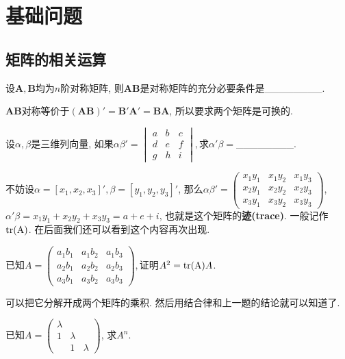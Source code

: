 \section{基础问题}

\subsection{矩阵的相关运算}
\begin{problem}
设$\boldsymbol{A},\boldsymbol{B}$均为$n$阶对称矩阵, 则$\boldsymbol{AB}$是对称矩阵的充分必要条件是\_\_\_\_\_\_\_\_.
\end{problem}

\begin{sol*}
$\boldsymbol{AB}$对称等价于$(\boldsymbol{AB})'=\boldsymbol{B}'\boldsymbol{A}'=\boldsymbol{BA}$,
所以要求两个矩阵是可换的. 
\end{sol*}
\begin{problem}
设$\alpha,$$\beta$是三维列向量, 如果$\alpha\beta'=\begin{vmatrix}a & b & c\\
d & e & f\\
g & h & i
\end{vmatrix},$求$\alpha'\beta=$\_\_\_\_\_\_\_\_.
\end{problem}

\begin{sol*}
不妨设$\alpha=[x_{1},x_{2},x_{3}]',$$\beta=\left[y_{1},y_{2},y_{3}\right]'$,
那么$\alpha\beta'=\begin{pmatrix}x_{1}y_{1} & x_{1}y_{2} & x_{1}y_{3}\\
x_{2}y_{1} & x_{2}y_{2} & x_{2}y_{3}\\
x_{3}y_{1} & x_{3}y_{2} & x_{3}y_{3}
\end{pmatrix}$, $\alpha'\beta=x_{1}y_{1}+x_{2}y_{2}+x_{3}y_{3}=a+e+i$, 也就是这个矩阵的\textbf{迹(trace)}.
一般记作$\text{tr(A)}$. 在后面我们还可以看到这个内容再次出现. 
\end{sol*}
\begin{problem}
已知$A=\begin{pmatrix}a_{1}b_{1} & a_{1}b_{2} & a_{1}b_{3}\\
a_{2}b_{1} & a_{2}b_{2} & a_{2}b_{3}\\
a_{3}b_{1} & a_{3}b_{2} & a_{3}b_{3}
\end{pmatrix},$证明$A^{2}=\text{tr(A)}A$. 
\end{problem}

\begin{sol*}
可以把它分解开成两个矩阵的乘积. 然后用结合律和上一题的结论就可以知道了. 
\end{sol*}
\begin{problem}
已知$A=\begin{pmatrix}\lambda\\
1 & \lambda\\
 & 1 & \lambda
\end{pmatrix}$, 求$A^{n}$.
\end{problem}

